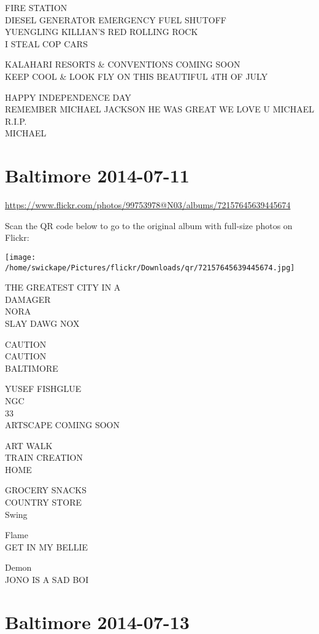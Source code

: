 \documentclass[10pt,letterpaper]{article}
\begin{document}
FIRE STATION\\
DIESEL GENERATOR EMERGENCY FUEL SHUTOFF\\
YUENGLING KILLIAN'S RED ROLLING ROCK\\
I STEAL COP CARS

KALAHARI RESORTS \& CONVENTIONS COMING SOON\\
KEEP COOL \& LOOK FLY ON THIS BEAUTIFUL 4TH OF JULY

HAPPY INDEPENDENCE DAY\\
REMEMBER MICHAEL JACKSON HE WAS GREAT WE LOVE U MICHAEL R.I.P.\\
MICHAEL
\pagebreak

\section*{Baltimore 2014-07-11}

\url{https://www.flickr.com/photos/99753978@N03/albums/72157645639445674}

Scan the QR code below to go to the original album with full-size photos on Flickr:

\texttt{[image: /home/swickape/Pictures/flickr/Downloads/qr/72157645639445674.jpg]}
\pagebreak

THE GREATEST CITY IN A\\
DAMAGER\\
NORA\\
SLAY DAWG NOX

CAUTION\\
CAUTION\\
BALTIMORE

YUSEF FISHGLUE\\
NGC\\
33\\
ARTSCAPE COMING SOON

ART WALK\\
TRAIN CREATION\\
HOME

GROCERY SNACKS\\
COUNTRY STORE\\
Swing

Flame\\
GET IN MY BELLIE

Demon\\
JONO IS A SAD BOI
\pagebreak

\section*{Baltimore 2014-07-13}
\end{document}
